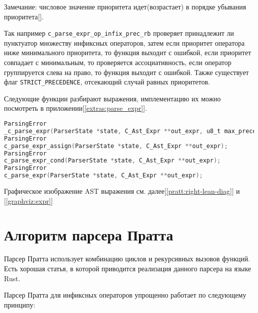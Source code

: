 Замечание: числовое значение приоритета идет(возрастает) в порядке убывания приоритета[\cite{cppref_op_prec}].

Так например \verb|c_parse_expr_op_infix_prec_rb| проверяет принадлежит ли пунктуатор множеству инфиксных операторов,
затем если приоритет оператора ниже минимального приоритета, то функция выходит с ошибкой, 
если приоритет совпадает с минимальным, то проверяется ассоциативность, если оператор группируется слева на право, то функция выходит с ошибкой.
Также существует флаг \verb|STRICT_PRECEDENCE|, отсекающий случай равных приоритетов.

Следующие функции разбирают выражения, имплементацию их можно посмотреть в приложении[\ref{extras:parse_expr}].

\begin{lstlisting}[language=c, caption={Заголовки функции разбора выражений}, label={parsing:expr:parse-expr-headers}]
ParsingError
_c_parse_expr(ParserState *state, C_Ast_Expr **out_expr, u8_t max_precedence, C_ExprFlags flags);
ParsingError
c_parse_expr_assign(ParserState *state, C_Ast_Expr **out_expr);
ParsingError
c_parse_expr_cond(ParserState *state, C_Ast_Expr **out_expr);
ParsingError
c_parse_expr(ParserState *state, C_Ast_Expr **out_expr);
\end{lstlisting}


Графическое изображение AST выражения см. далее[\ref{pratt:right-lean-diag}] и [\ref{graphviz:expr}]

\section{Алгоритм парсера Пратта}
\label{pass:parsing:pratt}

Парсер Пратта использует комбинацию циклов и рекурсивных вызовов функций.
Есть хорошая статья, в которой приводится реализация данного парсера на языке Rust\cite{matklad_pratt_parsers}.

Парсер Пратта для инфиксных операторов упрощенно работает по следующему принципу: 

    

